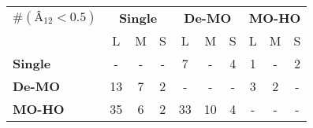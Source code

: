 \begin{tabular}{ l | c c c | c c c | c c c }
\hline 
\textbf{$\#(\textit{\^{A}}_{12} < 0.5)$}&\multicolumn{3}{c}{\textbf{Single}}&\multicolumn{3}{c}{\textbf{De-MO}}&\multicolumn{3}{c}{\textbf{MO-HO}}\\ 
 & L & M & S& L & M & S& L & M & S \\ 
\hline 
\textbf{Single}&-&-&-&7&-&4&1&-&2\\ 
\textbf{De-MO}&13&7&2&-&-&-&3&2&-\\ 
\textbf{MO-HO}&35&6&2&33&10&4&-&-&-\\ 
\hline
\end{tabular}
